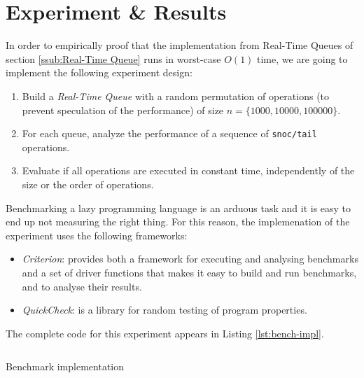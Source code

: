 \documentclass[12pt, a4paper]{article} %
\newcommand{\code}[1]{\texttt{#1}} %
\begin{document}

\section{Experiment \& Results}%
\label{sec:experiment}

In order to empirically proof that the implementation from Real-Time Queues of section \ref{ssub:Real-Time Queue} runs in worst-case $O(1)$ time, we are going to implement the following experiment design:

\begin{enumerate}
  \item Build a \textit{Real-Time Queue} with a random permutation of operations (to prevent speculation of the performance) of size $n = \{ 1000, 10000, 100000 \}$.
  \item For each queue, analyze the performance of a sequence of \code{snoc/tail} operations.
  \item Evaluate if all operations are executed in constant time, independently of the size or the order of operations.
\end{enumerate}

Benchmarking a lazy programming language is an arduous task and it is easy to end up not measuring the right thing. For this reason, the implemenation of the experiment uses the following frameworks:

\begin{itemize}
  \item \textit{Criterion}: provides both a framework for executing and analysing benchmarks and a set of driver functions that makes it easy to build and run benchmarks, and to analyse their results.
  \item \textit{QuickCheck}: is a library for random testing of program properties.
\end{itemize}

The complete code for this experiment appears in Listing \ref{lst:bench-impl}.

\begin{listing}[H]
    \inputminted[breaklines=true,fontsize=\scriptsize]{haskell}{../../Experiments/RealTimeQueues/Main.hs}
    \caption{Benchmark implementation}
    \label{lst:bench-impl}
\end{listing}
\end{document}
